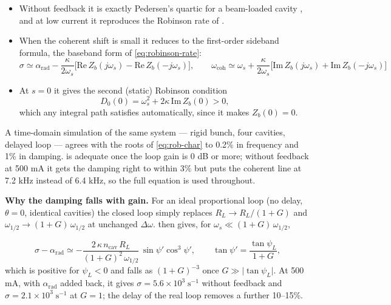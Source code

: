 \begin{itemize}
\item Without feedback it is exactly Pedersen's quartic for a beam-loaded cavity , and at low current it reproduces the Robinson rate of .
\item When the coherent shift is small it reduces to the first-order sideband formula, the baseband form of \cref{eq:robinson-rate}:
\begin{equation}\label{eq:rob-first}
\sigma \simeq \alpha_\text{rad} - \frac{\kappa}{2\omega_s}\bigl[\text{Re}\,Z_b(j\omega_s) - \text{Re}\,Z_b(-j\omega_s)\bigr],
\qquad
\omega_\text{coh} \simeq \omega_s + \frac{\kappa}{2\omega_s}\bigl[\text{Im}\,Z_b(j\omega_s) + \text{Im}\,Z_b(-j\omega_s)\bigr]
\end{equation}
\item At \(s = 0\) it gives the second (static) Robinson condition
\begin{equation}\label{eq:rob-static}
D_0(0) = \omega_s^2 + 2\kappa\,\text{Im}\,Z_b(0) > 0,
\end{equation}
which any integral path satisfies automatically, since it makes \(Z_b(0) = 0\).
\end{itemize}

A time-domain simulation of the same system --- rigid bunch, four cavities, delayed loop --- agrees with the roots of \cref{eq:rob-char} to 0.2\% in frequency and 1\% in damping.  is adequate once the loop gain is 0 dB or more; without feedback at 500 mA it gets the damping right to within 3\% but puts the coherent line at 7.2 kHz instead of 6.4 kHz, so the full equation is used throughout.

\textbf{Why the damping falls with gain.} For an ideal proportional loop (no delay, \(\theta = 0\), identical cavities) the closed loop simply replaces \(R_L \to R_L/(1+G)\) and \(\omega_{1/2} \to (1+G)\,\omega_{1/2}\) at unchanged \(\Delta\omega\).  then gives, for \(\omega_s \ll (1+G)\,\omega_{1/2}\),

\begin{equation}\label{eq:rob-ideal}
\sigma - \alpha_\text{rad} \simeq -\frac{2\,\kappa\,n_\text{cav}\,R_L}{(1+G)^2\,\omega_{1/2}}\,\sin\psi'\cos^3\psi',
\qquad \tan\psi' = \frac{\tan\psi_L}{1+G},
\end{equation}
which is positive for \(\psi_L < 0\) and falls as \((1+G)^{-3}\) once \(G \gg \lvert\tan\psi_L\rvert\). At 500 mA, with \(\alpha_\text{rad}\) added back, it gives \(\sigma = 5.6\times10^3\;\text{s}^{-1}\) without feedback and \(\sigma = 2.1\times10^3\;\text{s}^{-1}\) at \(G = 1\); the delay of the real loop removes a further 10--15\%.

